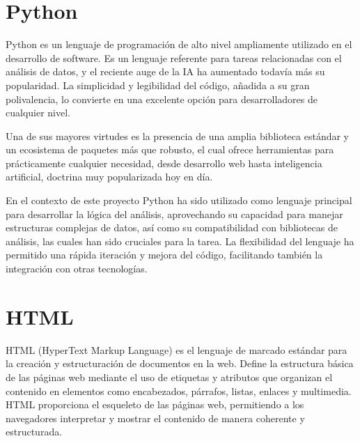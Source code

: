 \documentclass[a4paper, 12pt]{book}
\begin{document}


\section{Python}
Python es un lenguaje de programación de alto nivel ampliamente utilizado en el desarrollo de software. Es un lenguaje referente para tareas relacionadas con el análisis de datos, y el reciente auge de la IA ha aumentado todavía más su popularidad. La simplicidad y legibilidad del código, añadida a su gran polivalencia, lo convierte en una excelente opción para desarrolladores de cualquier nivel.

Una de sus mayores virtudes es la presencia de una amplia biblioteca estándar y un ecosistema de paquetes más que robusto, el cual ofrece herramientas para prácticamente cualquier necesidad, desde desarrollo web hasta inteligencia artificial, doctrina muy popularizada hoy en día.

En el contexto de este proyecto Python ha sido utilizado como lenguaje principal para desarrollar la lógica del análisis, aprovechando su capacidad para manejar estructuras complejas de datos, así como su compatibilidad con bibliotecas de análisis, las cuales han sido cruciales para la tarea. La flexibilidad del lenguaje ha permitido una rápida iteración y mejora del código, facilitando también la integración con otras tecnologías.

\section{HTML}
HTML (HyperText Markup Language) es el lenguaje de marcado estándar para la creación y estructuración de documentos en la web. Define la estructura básica de las páginas web mediante el uso de etiquetas y atributos que organizan el contenido en elementos como encabezados, párrafos, listas, enlaces y multimedia. HTML proporciona el esqueleto de las páginas web, permitiendo a los navegadores interpretar y mostrar el contenido de manera coherente y estructurada.
\end{document}
